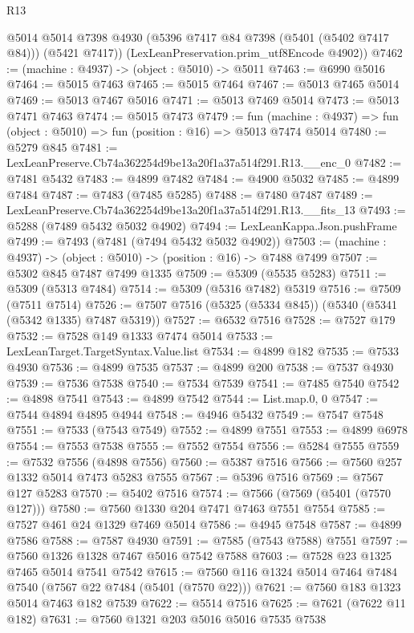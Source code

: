 \begin{lexlean}{R13}
\begin{coremodule}
        @5014
        @5014
        @7398
        @4930
        (@5396 @7417 @84 @7398 (@5401 (@5402 @7417 @84)))
        (@5421 @7417))
      (LexLeanPreservation.prim_utf8Encode @4902))
@7462 := (machine : @4937) -> (object : @5010) -> @5011
@7463 := @6990 @5016
@7464 := @5015 @7463
@7465 := @5015 @7464
@7467 := @5013 @7465 @5014
@7469 := @5013 @7467 @5016
@7471 := @5013 @7469 @5014
@7473 := @5013 @7471 @7463
@7474 := @5015 @7473
@7479 := fun (machine : @4937) => fun (object : @5010) => fun (position : @16) => @5013 @7474 @5014
@7480 := @5279 @845
@7481 := LexLeanPreserve.Cb74a362254d9be13a20f1a37a514f291.R13.__enc_0
@7482 := @7481 @5432
@7483 := @4899 @7482
@7484 := @4900 @5032
@7485 := @4899 @7484
@7487 := @7483 (@7485 @5285)
@7488 := @7480 @7487
@7489 := LexLeanPreserve.Cb74a362254d9be13a20f1a37a514f291.R13.__fits_13
@7493 := @5288 (@7489 @5432 @5032 @4902)
@7494 := LexLeanKappa.Json.pushFrame
@7499 := @7493 (@7481 (@7494 @5432 @5032 @4902))
@7503 := (machine : @4937) -> (object : @5010) -> (position : @16) -> @7488 @7499
@7507 := @5302 @845 @7487 @7499 @1335
@7509 := @5309 (@5535 @5283)
@7511 := @5309 (@5313 @7484)
@7514 := @5309 (@5316 @7482) @5319
@7516 := @7509 (@7511 @7514)
@7526 := @7507 @7516 (@5325 (@5334 @845)) (@5340 (@5341 (@5342 @1335) @7487 @5319))
@7527 := @6532 @7516
@7528 := @7527 @179
@7532 := @7528 @149 @1333 @7474 @5014
@7533 := LexLeanTarget.TargetSyntax.Value.list
@7534 := @4899 @182
@7535 := @7533 @4930
@7536 := @4899 @7535
@7537 := @4899 @200
@7538 := @7537 @4930
@7539 := @7536 @7538
@7540 := @7534 @7539
@7541 := @7485 @7540
@7542 := @4898 @7541
@7543 := @4899 @7542
@7544 := List.map.{0, 0}
@7547 := @7544 @4894 @4895 @4944
@7548 := @4946 @5432
@7549 := @7547 @7548
@7551 := @7533 (@7543 @7549)
@7552 := @4899 @7551
@7553 := @4899 @6978
@7554 := @7553 @7538
@7555 := @7552 @7554
@7556 := @5284 @7555
@7559 := @7532 @7556 (@4898 @7556)
@7560 := @5387 @7516
@7566 := @7560 @257 @1332 @5014 @7473 @5283 @7555
@7567 := @5396 @7516
@7569 := @7567 @127 @5283
@7570 := @5402 @7516
@7574 := @7566 (@7569 (@5401 (@7570 @127)))
@7580 := @7560 @1330 @204 @7471 @7463 @7551 @7554
@7585 := @7527 @461 @24 @1329 @7469 @5014
@7586 := @4945 @7548
@7587 := @4899 @7586
@7588 := @7587 @4930
@7591 := @7585 (@7543 @7588) @7551
@7597 := @7560 @1326 @1328 @7467 @5016 @7542 @7588
@7603 := @7528 @23 @1325 @7465 @5014 @7541 @7542
@7615 := @7560 @116 @1324 @5014 @7464 @7484 @7540 (@7567 @22 @7484 (@5401 (@7570 @22)))
@7621 := @7560 @183 @1323 @5014 @7463 @182 @7539
@7622 := @5514 @7516
@7625 := @7621 (@7622 @11 @182)
@7631 := @7560 @1321 @203 @5016 @5016 @7535 @7538

\end{coremodule}
\end{lexlean}
